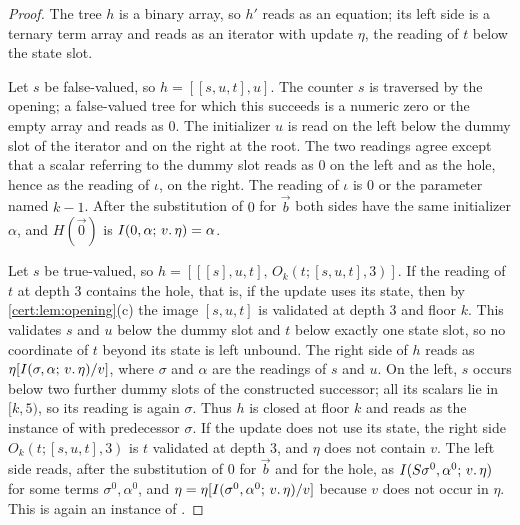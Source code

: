 \begin{proof}
The tree $h$ is a binary array, so $h'$ reads as an equation; its left side
is a ternary term array and reads as an iterator with update $\eta$, the
reading of $t$ below the state slot.

Let $s$ be false-valued, so $h=[[s,u,t],u]$. The counter $s$ is traversed by
the opening; a false-valued tree for which this succeeds is a numeric zero or
the empty array and reads as $0$. The initializer $u$ is read on the left
below the dummy slot of the iterator and on the right at the root. The two
readings agree except that a scalar referring to the dummy slot reads as $0$
on the left and as the hole, hence as the reading of $\iota$, on the right.
The reading of $\iota$ is $0$ or the parameter named $k-1$. After the
substitution of $0$ for $\vec b$ both sides have the same initializer
$\alpha$, and $H(\vec 0)$ is $I(0,\alpha;\,v.\,\eta)=\alpha$.

Let $s$ be true-valued, so $h=[[[s],u,t],\,O_k(t;[s,u,t],3)]$. If the reading
of $t$ at depth $3$ contains the hole, that is, if the update uses its state,
then by \cref{cert:lem:opening}(c) the image $[s,u,t]$ is validated at depth
$3$ and floor $k$. This validates $s$ and $u$ below the dummy slot and $t$
below exactly one state slot, so no coordinate of $t$ beyond its state is
left unbound. The right side of $h$ reads as $\eta[I(\sigma,\alpha;\,v.\,\eta)/v]$,
where $\sigma$ and $\alpha$ are the readings of $s$ and $u$. On the left, $s$
occurs below two further dummy slots of the constructed successor; all its
scalars lie in $[k,5)$, so its reading is again $\sigma$. Thus $h$ is closed
at floor $k$ and reads as the instance of  with predecessor
$\sigma$. If the update does not use its state, the right side
$O_k(t;[s,u,t],3)$ is $t$ validated at depth $3$, and $\eta$ does not contain
$v$. The left side reads, after the substitution of $0$ for $\vec b$ and for
the hole, as $I(S\sigma^{0},\alpha^{0};\,v.\,\eta)$ for some terms
$\sigma^{0},\alpha^{0}$, and $\eta=\eta[I(\sigma^{0},\alpha^{0};\,v.\,\eta)/v]$
because $v$ does not occur in $\eta$. This is again an instance of
.
\end{proof}

